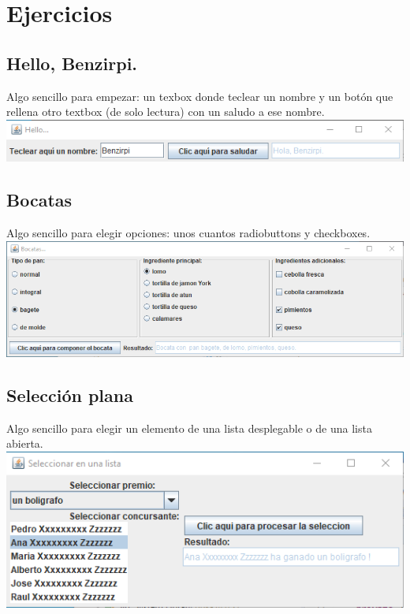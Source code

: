 \documentclass[spanish,12pt,a4paper,final,oneside]{book}
\begin{document}
\section{Ejercicios}\label{ejercicios_gui}


\subsection{Hello, Benzirpi.}\label{ejercicio_hellobenzirpi}
Algo sencillo para empezar: un texbox donde teclear un nombre y un botón que rellena otro textbox (de solo lectura) con un saludo a ese nombre.
\\ \includegraphics[width=\textwidth]{HelloBenzirpi - pantallazo - Java}

\subsection{Bocatas}\label{ejercicio_bocatas}
Algo sencillo para elegir opciones: unos cuantos radiobuttons y checkboxes.
\\ \includegraphics[width=\textwidth]{Bocatas - pantallazo - Java}

\subsection{Selección plana}\label{ejercicio_selecionplana}
Algo sencillo para elegir un elemento de una lista desplegable o de una lista abierta.
\\\includegraphics[width=\textwidth]{Seleccion Plana - pantallazo - Java}
\end{document}
